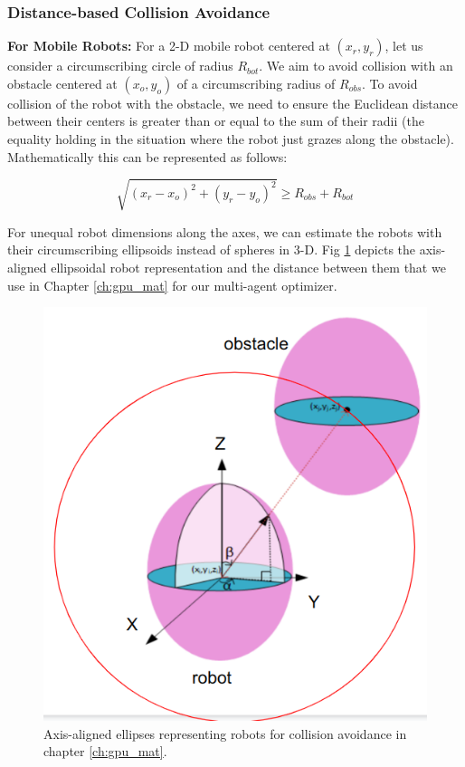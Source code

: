 \subsubsection{Distance-based Collision Avoidance}\label{sec:distance-based-collision}

\textbf{For Mobile Robots:}
For a 2-D mobile robot centered at $(x_r, y_r)$, let us consider a circumscribing circle of radius $R_{bot}$. We aim to avoid collision with an obstacle centered at $(x_o, y_o)$ of a circumscribing radius of $R_{obs}$. To avoid collision of the robot with the obstacle, we need to ensure the Euclidean distance between their centers is greater than or equal to the sum of their radii (the equality holding in the situation where the robot just grazes along the obstacle). Mathematically this can be represented as follows:

\begin{equation}
    \sqrt{(x_r - x_o)^2 + (y_r - y_o)^2} \geq R_{obs}+R_{bot}
\end{equation}

For unequal robot dimensions along the axes, we can estimate the robots with their circumscribing ellipsoids instead of spheres in 3-D. Fig \ref{fig:robot-ellipsoidals} depicts the axis-aligned ellipsoidal robot representation and the distance between them that we use in Chapter \ref{ch:gpu_mat} for our multi-agent optimizer.

\begin{figure}[ht]
    \centering
    \includegraphics[scale=0.5]{figures/background/ellipsoidals.png}
    \caption[Ellipsoidal Robots]{Axis-aligned ellipses representing robots for collision avoidance in chapter \ref{ch:gpu_mat}.}
    \label{fig:robot-ellipsoidals}
\end{figure}

